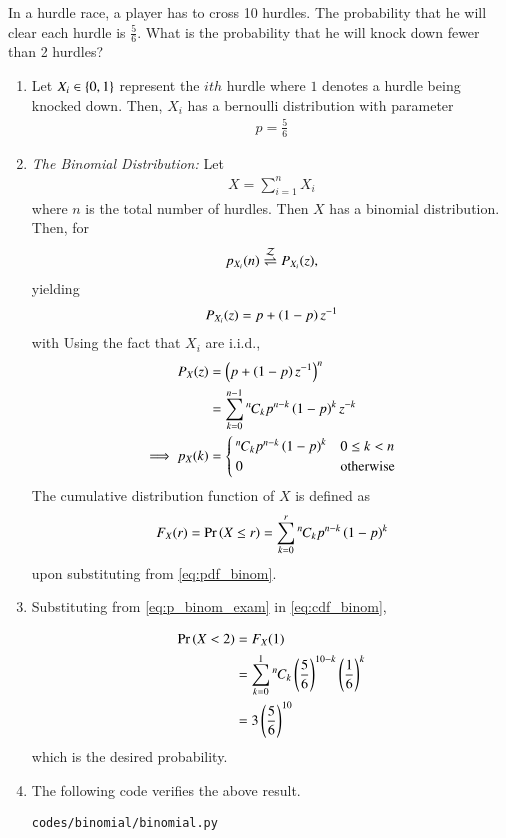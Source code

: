 In a hurdle race, a player has to cross 10 hurdles. The probability that he will
clear each hurdle is $\frac{5}{6}$. What is the probability that he will knock down fewer than 2 hurdles?
\renewcommand{\theequation}{\theenumi}
\renewcommand{\thefigure}{\theenumi}
\begin{enumerate}[label=\thesubsection.\arabic*.,ref=\thesubsection.\theenumi]
%
%
\item  Let $X_i \in \left\{0,1\right\}$ represent the $ith$ hurdle where $1$ denotes a hurdle being knocked down.  Then, $X_i$ has a bernoulli distribution with parameter
\begin{align}
p = \frac{5}{6}
\label{eq:p_binom_exam}
\end{align}

\item {\em The Binomial Distribution: } Let
\begin{align}
X = \sum_{i=1}^{n}X_i
\end{align}
%
where $n$ is the total number of hurdles.
Then $X$ has a binomial distribution.  Then, for 
\begin{align}
p_{X_i}(n) \overset{\mathcal{Z}}{ \rightleftharpoons} P_{X_i}(z),
\end{align}
yielding
\begin{align}
 P_{X_i}(z) = p + \left(1-p\right)z^{-1}
\end{align}
 with
%
Using the fact that $X_i$ are i.i.d.,
\begin{align}
\label{eq:ztrans_binom}
 P_{X}(z) &= \left(p + \left(1-p\right)z^{-1}\right)^n
\\
&= \sum_{k=0}^{n-1}{{}^{n}\mkern-1muC_{k}}p^{n-k}\left(1-p\right)^kz^{-k}
\\
\implies p_{X}(k) &= 
\begin{cases}
{{}^{n}\mkern-1muC_{k}}p^{n-k}\left(1-p\right)^k & 0 \le k < n
\\
0 & \text{otherwise}
\end{cases}
\label{eq:pdf_binom}
\end{align}
%
The cumulative distribution function of $X$ is defined as
\begin{align}
F_{X}(r) = \Pr\left(X\le r\right) = \sum_{k=0}^{r}{{}^{n}\mkern-1muC_{k}}p^{n-k}\left(1-p\right)^k
\label{eq:cdf_binom}
\end{align}
%
upon substituting from \eqref{eq:pdf_binom}.

\item Substituting from \eqref{eq:p_binom_exam} in \eqref{eq:cdf_binom},

\begin {align}
\Pr\left(X < 2\right) &= F_{X}(1)
\\
&=\sum_{k=0}^{1}{{}^{n}\mkern-1muC_{k}}\left(\frac{5}{6}\right)^{10-k}\left(\frac{1}{6}\right)^k
\\
&=3\left(\frac{5}{6}\right)^{10}
\end{align}
%
which is the desired probability.
%
\item The following code verifies the above result.
\begin{lstlisting}
codes/binomial/binomial.py
\end{lstlisting}
\end{enumerate}
